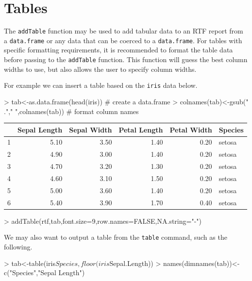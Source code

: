 \documentclass[11pt,letterpaper]{article}
\begin{document}
\section{Tables}
The \texttt{addTable} function may be used to add tabular data to an RTF report from a \texttt{data.frame} or any data that can be coerced to a \texttt{data.frame}.  For tables with specific formatting requirements, it is recommended to format the table data before passing to the \texttt{addTable} function.  This function will guess the best column widths to use, but also allows the user to specify column widths.


For example we can insert a table based on the \texttt{iris} data below.

\begin{Schunk}
\begin{Sinput}
> tab<-as.data.frame(head(iris)) # create a data.frame
> colnames(tab)<-gsub("\\."," ",colnames(tab)) # format column names
\end{Sinput}
\end{Schunk}

\begin{table}[!htbp]
\centering
\begin{tabular}{rrrrrl}
  \hline
 & Sepal Length & Sepal Width & Petal Length & Petal Width & Species \\ 
  \hline
1 & 5.10 & 3.50 & 1.40 & 0.20 & setosa \\ 
  2 & 4.90 & 3.00 & 1.40 & 0.20 & setosa \\ 
  3 & 4.70 & 3.20 & 1.30 & 0.20 & setosa \\ 
  4 & 4.60 & 3.10 & 1.50 & 0.20 & setosa \\ 
  5 & 5.00 & 3.60 & 1.40 & 0.20 & setosa \\ 
  6 & 5.40 & 3.90 & 1.70 & 0.40 & setosa \\ 
   \hline
\end{tabular}
\end{table}
\begin{Schunk}
\begin{Sinput}
> addTable(rtf,tab,font.size=9,row.names=FALSE,NA.string="-")
\end{Sinput}
\end{Schunk}



We may also want to output a table from the \texttt{table} command, such as the following.
\begin{Schunk}
\begin{Sinput}
> tab<-table(iris$Species,floor(iris$Sepal.Length))
> names(dimnames(tab))<-c("Species","Sepal Length")
\end{Sinput}
\end{Schunk}
\end{document}
